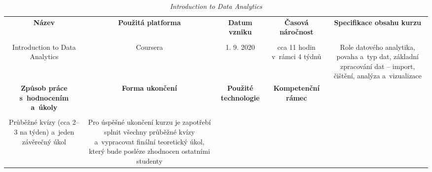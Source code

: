 \begin{landscape}

\begin{table}[htbp]

\renewcommand\thetable{6}

\caption{\textit{Introduction to Data Analytics}}\label{tab6}

\footnotesize

{

\justifying

\begin{tabularx}{\linewidth}{CCCCC}

\toprule

\textbf{Název} &

\textbf{Použitá platforma} &

\textbf{Datum vzniku} &

\textbf{Časová náročnost} &
 
\textbf{Specifikace obsahu kurzu}

\\

\tabularnewline
\midrule

Introduction to Data Analytics

&

Coursera

&

1. 9. 2020

&

cca 11 hodin v~rámci 4 týdnů

&

Role datového analytika, povaha a~typ dat, základní zpracování dat – import, čištění, analýza a~vizualizace

\\
\toprule

\textbf{Způsob práce s~hodnocením a~úkoly} &

\textbf{Forma ukončení} &

\textbf{Použité technologie} &

\textbf{Kompetenční rámec} 

\\

\tabularnewline
\midrule

Průběžné kvízy (cca 2–3 na týden) a~jeden závěrečný úkol    

&

Pro úspěšné ukončení kurzu je zapotřebí splnit všechny průběžné kvízy a~vypracovat finální teoretický úkol, který bude posléze zhodnocen ostatními studenty


\end{tabularx}}
\end{table}
\end{landscape}
